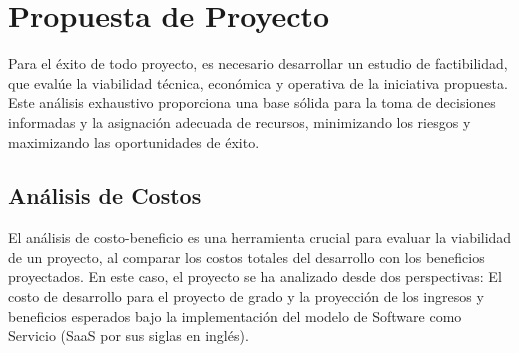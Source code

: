 \chapter{Propuesta de Proyecto}
\label{sec:propuesta}

Para el éxito de todo proyecto, es necesario desarrollar un estudio de factibilidad, que evalúe la viabilidad técnica, económica y operativa de la iniciativa propuesta.  Este análisis exhaustivo proporciona una base sólida para la toma de decisiones informadas y la asignación adecuada de recursos, minimizando los riesgos y maximizando las oportunidades de éxito.

\section{Análisis de Costos}

El análisis de costo-beneficio es una herramienta crucial para evaluar la viabilidad de un proyecto, al comparar los costos totales del desarrollo con los beneficios proyectados. En este caso, el proyecto se ha analizado desde dos perspectivas: El costo de desarrollo para el proyecto de grado y la proyección de los ingresos y beneficios esperados bajo la implementación del modelo de Software como Servicio (SaaS por sus siglas en inglés).


